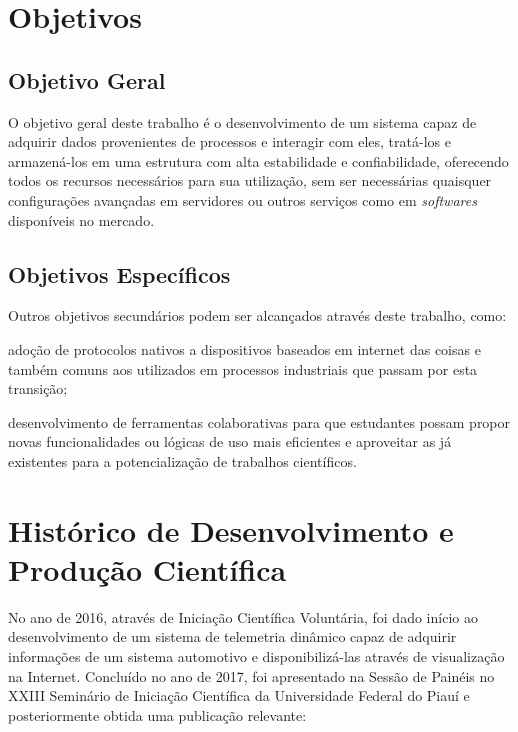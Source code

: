 \section{Objetivos}
\label{sec:objetivos}

\subsection{Objetivo Geral}
\label{sec:objetivo-geral}

O objetivo geral deste trabalho é o desenvolvimento de um sistema capaz de adquirir dados provenientes de processos e interagir com eles, tratá-los e armazená-los em uma estrutura com alta estabilidade e confiabilidade, oferecendo todos os recursos necessários para sua utilização, sem ser necessárias quaisquer configurações avançadas em servidores ou outros serviços como em  \textit{softwares} disponíveis no mercado.

\subsection{Objetivos Específicos}
\label{sec:objetivos-especificos}

Outros objetivos secundários podem ser alcançados através deste trabalho, como:

\begin{alineascomponto}
	\item adoção de protocolos nativos a dispositivos baseados em internet das coisas e também comuns aos utilizados em processos industriais que passam por esta transição;
    \item desenvolvimento de ferramentas colaborativas para que estudantes possam propor novas funcionalidades ou lógicas de uso mais eficientes e aproveitar as já existentes para a potencialização de trabalhos científicos.
\end{alineascomponto}

\section{Histórico de Desenvolvimento e Produção Científica}
\label{sec:historico-producao}

No ano de 2016, através de Iniciação Científica Voluntária, foi dado início ao desenvolvimento de um sistema de telemetria dinâmico capaz de adquirir informações de um sistema automotivo e disponibilizá-las através de visualização na Internet. Concluído no ano de 2017, foi apresentado na Sessão de Painéis no XXIII Seminário de Iniciação Científica da Universidade Federal do Piauí e posteriormente obtida uma publicação relevante:

